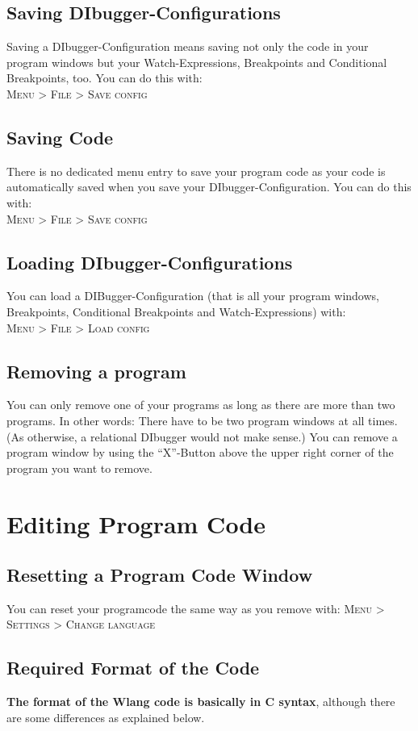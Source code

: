 \documentclass[parskip=full]{memoir}
\begin{document}
 \section{Saving DIbugger-Configurations}
Saving a DIbugger-Configuration means saving not only the code in your program windows but your Watch-Expressions, Breakpoints and Conditional Breakpoints, too.
You can do this with: \\
\textsc{Menu > File > Save config}
\section{Saving Code}
There is no dedicated menu entry to save your program code as your code is automatically saved when you save your DIbugger-Configuration. You can do this with: \\
\textsc{Menu > File > Save config}
\section{Loading DIbugger-Configurations}
You can load a DIBugger-Configuration (that is all your program windows, Breakpoints, Conditional Breakpoints and Watch-Expressions) with:\\
\textsc{Menu > File > Load config}
\section{Removing a program}\label{removeProgram}
You can only remove one of your programs as long as there are more than two programs. In other words: There have to be two program windows at all times. (As otherwise, a relational DIbugger would not make sense.)
You can remove a program window by using the \enquote{X}-Button above the upper right corner of the program you want to remove.
\chapter{Editing Program Code} %
\section{Resetting a Program Code Window}
You can reset your programcode the same way as you remove with:
 \textsc{Menu > Settings > Change language}
\section{Required Format of the Code}
\textbf{The format of the Wlang code is basically in C syntax}, although there are some differences as explained below.
\end{document}
